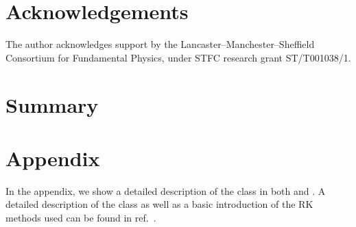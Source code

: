 \documentclass[11pt,a4paper]{article}
\renewcommand{\theequation}{\arabic{section}.\arabic{equation}}
\begin{document}
\section{Acknowledgements}
%
The author acknowledges support by the Lancaster–Manchester–Sheffield Consortium for Fundamental Physics, under STFC research grant ST/T001038/1.


\section{Summary}


\pagebreak
\setcounter{section}{0}
\section*{Appendix}
\appendix

\renewcommand{\theequation}{\Alph{section}.\arabic{equation}}
\setcounter{equation}{0}  %
In the appendix, we show a detailed description of the  class in both \CPP and \PY. A detailed description of the  class as well as a basic introduction of the RK methods used can be found in ref.~\cite{Karamitros:2021nxi}.
\end{document}
